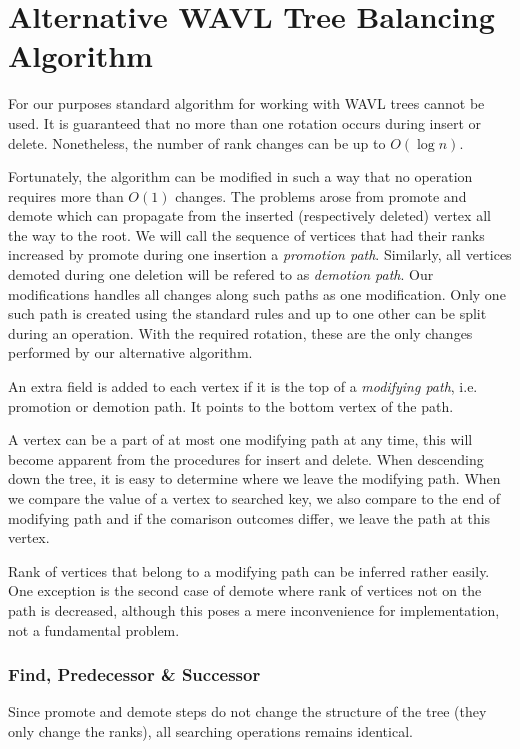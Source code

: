 \section{Alternative WAVL Tree Balancing Algorithm}

For our purposes standard algorithm for working with WAVL trees cannot be used. It is guaranteed that no more than one rotation occurs during insert or delete. Nonetheless, the number of rank changes can be up to $O(\log n)$. 

Fortunately, the algorithm can be modified in such a way that no operation requires more than $O(1)$ changes. The problems arose from promote and demote which can propagate from the inserted (respectively deleted) vertex all the way to the root. We will call the sequence of vertices that had their ranks increased by promote during one insertion a {\em promotion path}. Similarly, all vertices demoted during one deletion will be refered to as {\em demotion path}. Our modifications handles all changes along such paths as one modification. Only one such path is created using the standard rules and up to one other can be split during an operation. With the required rotation, these are the only changes performed by our alternative algorithm.

An extra field is added to each vertex if it is the top of a {\em modifying path}, i.e. promotion or demotion path. It points to the bottom vertex of the path.

A vertex can be a part of at most one modifying path at any time, this will become apparent from the procedures for insert and delete. When descending down the tree, it is easy to determine where we leave the modifying path. When we compare the value of a vertex to searched key, we also compare to the end of modifying path and if the comarison outcomes differ, we leave the path at this vertex. 

Rank of vertices that belong to a modifying path can be inferred rather easily. One exception is the second case of demote where rank of vertices not on the path is decreased, although this poses a mere inconvenience for implementation, not a fundamental problem.

\subsubsection{Find, Predecessor \& Successor}

Since promote and demote steps do not change the structure of the tree (they only change the ranks), all searching operations remains identical.

